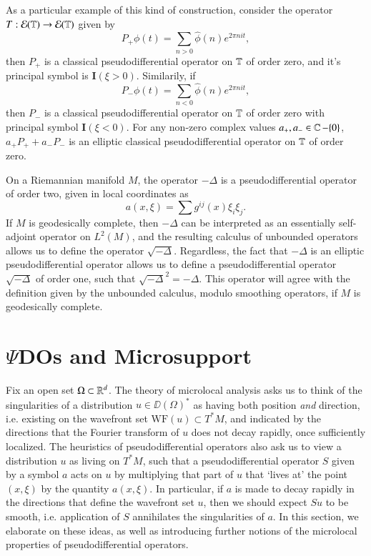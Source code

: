 \begin{example}
    As a particular example of this kind of construction, consider the operator $T: \operatorname{\mathcal{E}}(\operatorname{\mathbb{T}}) \to \operatorname{\mathcal{E}}(\operatorname{\mathbb{T}})$ given by
    \[ P_+ \phi(t) = \sum_{n > 0} \widehat{\phi}(n) e^{2 \pi nit}, \]
    then $P_+$ is a classical pseudodifferential operator on $\operatorname{\mathbb{T}}$ of order zero, and it's principal symbol is $\mathbf{I}(\xi > 0)$. Similarily, if
    \[ P_- \phi(t) = \sum_{n < 0} \widehat{\phi}(n) e^{2 \pi nit}, \]
    then $P_-$ is a classical pseudodifferential operator on $\operatorname{\mathbb{T}}$ of order zero with principal symbol $\mathbf{I}(\xi < 0)$. For any non-zero complex values $a_+,a_- \in \operatorname{\mathbb{C}} - \{ 0 \}$, $a_+ P_+ + a_- P_-$ is an elliptic classical pseudodifferential operator on $\operatorname{\mathbb{T}}$ of order zero.
\end{example}

\begin{example}
    On a Riemannian manifold $M$, the operator $-\Delta$ is a pseudodifferential operator of order two, given in local coordinates as
    \[ a(x,\xi) = \sum g^{ij}(x) \xi_i \xi_j. \]
    If $M$ is geodesically complete, then $-\Delta$ can be interpreted as an essentially self-adjoint operator on $L^2(M)$, and the resulting calculus of unbounded operators allows us to define the operator $\sqrt{-\Delta}$. Regardless, the fact that $-\Delta$ is an elliptic pseudodifferential operator allows us to define a pseudodifferential operator $\sqrt{-\Delta}$ of order one, such that $\sqrt{-\Delta}^2 = - \Delta$. This operator will agree with the definition given by the unbounded calculus, modulo smoothing operators, if $M$ is geodesically complete.
\end{example}











\section{$\Psi$DOs and Microsupport}

Fix an open set $\Omega \subset \operatorname{\mathbb{R}}^d$. The theory of microlocal analysis asks us to think of the singularities of a distribution $u \in \DD(\Omega)^*$ as having both position \emph{and} direction, i.e. existing on the wavefront set $\text{WF}(u) \subset T^* M$, and indicated by the directions that the Fourier transform of $u$ does not decay rapidly, once sufficiently localized. The heuristics of pseudodifferential operators also ask us to view a distribution $u$ as living on $T^*M$, such that a pseudodifferential operator $S$ given by a symbol $a$ acts on $u$ by multiplying that part of $u$ that `lives at' the point $(x,\xi)$ by the quantity $a(x,\xi)$. In particular, if $a$ is made to decay rapidly in the directions that define the wavefront set $u$, then we should expect $Su$ to be smooth, i.e. application of $S$ annihilates the singularities of $a$. In this section, we elaborate on these ideas, as well as introducing further notions of the microlocal properties of pseudodifferential operators.


